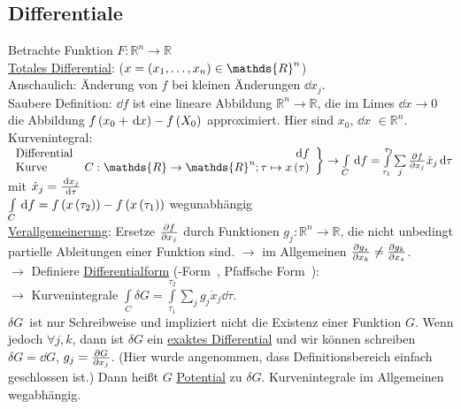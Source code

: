 \subsection{Differentiale}
Betrachte Funktion $F: \mathds{R}^n \to \mathds{R}$\\
\uline{Totales Differential}:  ($x=\norBra{x_1,\dots,x_n}\in \mathds{R}^n$)\\
Anschaulich: Änderung von $f$ bei kleinen Änderungen $\dd{x_j}$.\\
Saubere Definition: $\dd{f}$ ist eine lineare Abbildung $\mathds{R}^n \to \mathds{R}$, die im Limes $\dd{x}\to 0$ die Abbildung $f\left( x_0+\,\text d{x} \right)-f\left( X_0 \right)$ approximiert. Hier sind $x_0$, $\dd{x}$ $\in \mathds{R}^n$.\\
Kurvenintegral:\\
$\left.\begin{array}{l r}\text{Differential}&\dd{f} \\ \text{Kurve}&C: \mathds{R} \to \mathds{R}^n; \tau \mapsto x\norBra{\tau}\end{array} \right\} \to \int\limits_C \dd{f} = \int\limits_{\tau_1}^{\tau_2} \sum\limits_j \ppv{f}{x_j}\dot{x}_j \dd{\tau}$\\
mit $\dot{x}_j = \frac{\,\text d{x_j}}{\,\text d{\tau}}$\\
$\int\limits_C \,\text d{f} = f\left( x\left( \tau_2 \right) \right)-f\left( x\left( \tau_1 \right) \right)$ wegunabhängig\\
\uline{Verallgemeinerung}: Ersetze $\frac{\partial f}{\partial x_j}$ durch Funktionen $g_j: \mathds{R}^n \to \mathds{R}$, die nicht unbedingt partielle Ableitungen einer Funktion sind. $\rightarrow$ im Allgemeinen $\frac{\partial g_s}{\partial x_k} \neq \frac{\partial g_k}{\partial x_s}$.\\
$\rightarrow$ Definiere \uline{Differentialform} (-Form\grqq\ , \glqq Pfaffsche Form\grqq\ ):\\
 $\rightarrow$ Kurvenintegrale $\int\limits_C\delta G = \int\limits_{\tau_1}^{\tau_2} \sum\limits_j g_j \dot{x}_j \dd{\tau}$.\\
\glqq$\delta G$\grqq\ ist nur Schreibweise und impliziert nicht die Existenz einer Funktion $G$. Wenn jedoch  $\forall j,k$, dann ist $\delta G$ ein \uline{exaktes Differential} und wir können schreiben$\delta G = \dd{G}$, $g_j = \frac{\partial G}{\partial x_j}$. (Hier wurde angenommen, dass Definitionsbereich einfach geschlossen ist.) Dann heißt $G$ \uline{Potential} zu $\delta G$. Kurvenintegrale im Allgemeinen wegabhängig.\\
